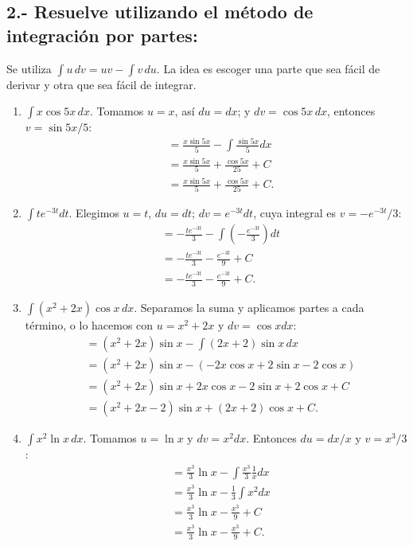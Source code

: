 \documentclass[12pt, letterpaper]{article}
\makeatletter
\renewcommand{\alph}[1]{\expandafter\@alphlatin\csname c@#1\endcsname}
\newcommand{\@alphlatin}[1]{\ifcase#1\or a\or b\or c\or d\or e\or f\or g\or h\or i\or j\or k\or l\or m\or n\or o\or p\or q\or r\or s\or t\or u\or v\or w\or x\or y\or z\else\@ctrerr\fi}
\makeatother
\begin{document}
\subsection{2.- Resuelve utilizando el método de integración por partes:}
Se utiliza $\displaystyle\int u\,dv=uv-\int v\,du$. La idea es escoger una parte que sea fácil de derivar y otra que sea fácil de integrar.
\begin{enumerate}[label=\alph*)]
  \item $\displaystyle\int x\cos5x\,dx$. Tomamos $u=x$, así $du=dx$; y $dv=\cos5x\,dx$, entonces $v=\sin5x/5$:
  \[
  \begin{aligned}
  &=\frac{x\sin5x}{5}-\int\frac{\sin5x}{5}dx\\
  &=\frac{x\sin5x}{5}+\frac{\cos5x}{25}+C\\
  &=\boxed{\frac{x\sin5x}{5}+\frac{\cos5x}{25}+C}.
  \end{aligned}
  \]
  \item $\displaystyle\int te^{-3t}dt$. Elegimos $u=t$, $du=dt$; $dv=e^{-3t}dt$, cuya integral es $v=-e^{-3t}/3$:
  \[
  \begin{aligned}
  &= -\frac{te^{-3t}}3-\int\left(-\frac{e^{-3t}}3\right)dt\\
  &= -\frac{te^{-3t}}3-\frac{e^{-3t}}9+C\\
  &=\boxed{-\frac{te^{-3t}}3-\frac{e^{-3t}}9+C}.
  \end{aligned}
  \]
  \item $\displaystyle\int(x^2+2x)\cos x\,dx$. Separamos la suma y aplicamos partes a cada término, o lo hacemos con $u=x^2+2x$ y $dv=\cos xdx$:
  \[
  \begin{aligned}
  &= (x^2+2x)\sin x-\int(2x+2)\sin x\,dx\\
  &=(x^2+2x)\sin x-\left(-2x\cos x+2\sin x-2\cos x\right)\\
  &=(x^2+2x)\sin x+2x\cos x-2\sin x+2\cos x+C\\
  &=\boxed{(x^2+2x-2)\sin x+(2x+2)\cos x+C}.
  \end{aligned}
  \]
  \item $\displaystyle\int x^2\ln x\,dx$. Tomamos $u=\ln x$ y $dv=x^2dx$. Entonces $du=dx/x$ y $v=x^3/3$:
  \[
  \begin{aligned}
  &=\frac{x^3}{3}\ln x-\int\frac{x^3}{3}\frac1x dx\\
  &=\frac{x^3}{3}\ln x-\frac13\int x^2dx\\
  &=\frac{x^3}{3}\ln x-\frac{x^3}{9}+C\\
  &=\boxed{\frac{x^3}{3}\ln x-\frac{x^3}{9}+C}.
  \end{aligned}
\]
\end{enumerate}
\end{document}

